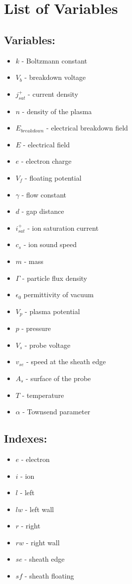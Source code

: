 \chapter*{List of Variables}
\begin{multicols}{2}
\section*{Variables:}
\begin{itemize}
\item $k$ - Boltzmann constant
\item $V_b$ - breakdown voltage
\item $j^+_{sat}$ - current density
\item $n$ - density of the plasma
\item $E_{breakdown}$ - electrical breakdown field
\item $E$ - electrical field
\item $e$ - electron charge
\item $V_f$ - floating potential
\item $\gamma$ - flow constant
\item $d$ - gap distance
\item $i^+_{sat}$ - ion saturation current
\item $c_s$ - ion sound speed
\item $m$ - mass 
\item $\Gamma$ - particle flux density
\item $\epsilon_0$ permittivity of vacuum
\item $V_p$ - plasma potential 
\item $p$ - pressure
\item $V_s$ - probe voltage
\item $v_{se}$ - speed at the sheath edge
\item $A_s$ - surface of the probe
\item $T$ - temperature
\item $\alpha$ - Townsend parameter
\end{itemize}

\section*{Indexes:}
\begin{itemize}
\item $e$ - electron
\item $i$ - ion
\item $l$ - left
\item $lw$ - left wall
\item $r$ - right
\item $rw$ - right wall
\item $se$ - sheath edge
\item $sf$ - sheath floating
\end{itemize}
\end{multicols}